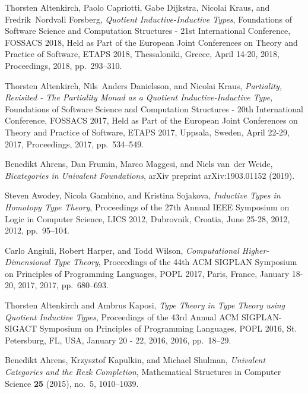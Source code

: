 \documentclass[9pt]{entcs}
\newcommand{\0}{\textbf{0}} %
\newcommand{\1}{\textbf{1}} %
\begin{document}
\begin{thebibliography}{10}\label{bibliography}
	
	Thorsten Altenkirch, Paolo Capriotti, Gabe Dijkstra, Nicolai Kraus, and
	Fredrik~Nordvall Forsberg, \emph{{Quotient Inductive-Inductive Types}},
	Foundations of Software Science and Computation Structures - 21st
	International Conference, {FOSSACS} 2018, Held as Part of the European Joint
	Conferences on Theory and Practice of Software, {ETAPS} 2018, Thessaloniki,
	Greece, April 14-20, 2018, Proceedings, 2018, pp.~293--310.
	
	Thorsten Altenkirch, Nils~Anders Danielsson, and Nicolai Kraus,
	\emph{{Partiality, Revisited - The Partiality Monad as a Quotient
			Inductive-Inductive Type}}, Foundations of Software Science and Computation
	Structures - 20th International Conference, {FOSSACS} 2017, Held as Part of
	the European Joint Conferences on Theory and Practice of Software, {ETAPS}
	2017, Uppsala, Sweden, April 22-29, 2017, Proceedings, 2017, pp.~534--549.
	
	Benedikt Ahrens, Dan Frumin, Marco Maggesi, and Niels van~der Weide,
	\emph{{Bicategories in Univalent Foundations}}, arXiv preprint
	arXiv:1903.01152 (2019).
	
	Steven Awodey, Nicola Gambino, and Kristina Sojakova, \emph{{Inductive Types in
			Homotopy Type Theory}}, Proceedings of the 27th Annual {IEEE} Symposium on
	Logic in Computer Science, {LICS} 2012, Dubrovnik, Croatia, June 25-28, 2012,
	2012, pp.~95--104.
	
	Carlo Angiuli, Robert Harper, and Todd Wilson, \emph{{Computational
			Higher-Dimensional Type Theory}}, Proceedings of the 44th {ACM} {SIGPLAN}
	Symposium on Principles of Programming Languages, {POPL} 2017, Paris, France,
	January 18-20, 2017, 2017, pp.~680--693.
	
	Thorsten Altenkirch and Ambrus Kaposi, \emph{{Type Theory in Type Theory using
			Quotient Inductive Types}}, Proceedings of the 43rd Annual {ACM}
	{SIGPLAN-SIGACT} Symposium on Principles of Programming Languages, {POPL}
	2016, St. Petersburg, FL, USA, January 20 - 22, 2016, 2016, pp.~18--29.
	
	Benedikt Ahrens, Krzysztof Kapulkin, and Michael Shulman, \emph{{Univalent
			Categories and the Rezk Completion}}, Mathematical Structures in Computer
	Science \textbf{25} (2015), no.~5, 1010--1039.
	

\end{thebibliography}
\end{document}
